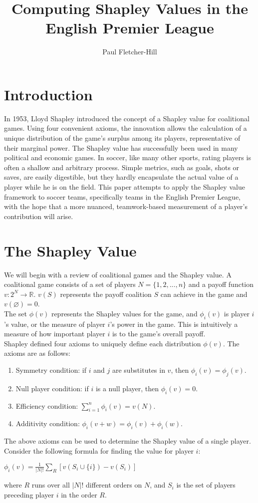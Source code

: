 \documentclass[a4paper,10pt]{article}
\newcommand{\br}{\\[10pt]}
\let\emptyset\varnothing
\begin{document}
  \title{Computing Shapley Values in the English Premier League}
  \author{Paul Fletcher-Hill}
  \maketitle
  \section*{Introduction}
  In 1953, Lloyd Shapley introduced the concept of a Shapley value for coalitional games. Using four convenient axioms, the innovation allows the calculation of a unique distribution of the game’s surplus among its players, representative of their marginal power. The Shapley value has successfully been used in many political and economic games. In soccer, like many other sports, rating players is often a shallow and arbitrary process. Simple metrics, such as goals, shots or saves, are easily digestible, but they hardly encapsulate the actual value of a player while he is on the field. This paper attempts to apply the Shapley value framework to soccer teams, specifically teams in the English Premier League, with the hope that a more nuanced, teamwork-based measurement of a player’s contribution will arise.
  
  \section*{The Shapley Value}
  We will begin with a review of coalitional games and the Shapley value. A coalitional game consists of a set of players $N = \{1, 2, ..., n\}$ and a payoff function $v : 2^N \rightarrow \mathbb{R}$. $v(S)$ represents the payoff coalition $S$ can achieve in the game and $v(\emptyset) = 0$. 
  \br
  The set $\phi(v)$ represents the Shapley values for the game, and $\phi_i(v)$ is player $i$'s value, or the measure of player $i$'s power in the game. This is intuitively a measure of how important player $i$ is to the game's overall payoff.
  \br
  Shapley defined four axioms to uniquely define each distribution $\phi(v)$. The axioms are as follows:
  \begin{enumerate}
    \item Symmetry condition: if $i$ and $j$ are substitutes in $v$, then $\phi_i(v) = \phi_j(v)$.
    \item Null player condition: if $i$ is a null player, then $\phi_i(v) = 0$.
    \item Efficiency condition: $\sum\limits_{i=1}^{n} \phi_i(v) = v(N)$.
    \item Additivity condition: $\phi_i(v + w) = \phi_i(v) + \phi_i(w)$.
  \end{enumerate}
  The above axioms can be used to determine the Shapley value of a single player. Consider the following formula for finding the value for player $i$:
  \begin{center}
    $\phi_i(v) = \frac{1}{|N|!} \sum\limits_{R}[v(S_i \cup \{i\}) - v(S_i)]$
  \end{center}
  where $R$ runs over all $|N|!$ different orders on $N$, and $S_i$ is the set of players preceding player $i$ in the order $R$.
  
\end{document}
